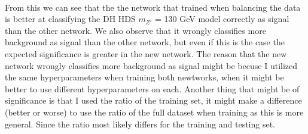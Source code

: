 \documentclass[14pt, a4paper]{book}
\begin{document}
\\From this we can see that the the network that trained when balancing the data is better at classifying the DH HDS $m_{Z'}$ = 130 GeV model correctly as signal than the other network. We also observe that it wrongly classifies more background as signal than the other network, but even if this is the case the expected significance is greater in the new network.
The reason that the new network wrongly classifies more background as signal might be becuse I utilized the same hyperparameters when training both newtworks, when it might be better to use different hyperparameters on each. 
Another thing that might be of significance is that I used the ratio of the training set, it might make a difference (better or worse) to use the ratio of the full dataset when training as this is more general. 
Since the ratio most likely differs for the training and testing set. 
\clearpage
\end{document}
